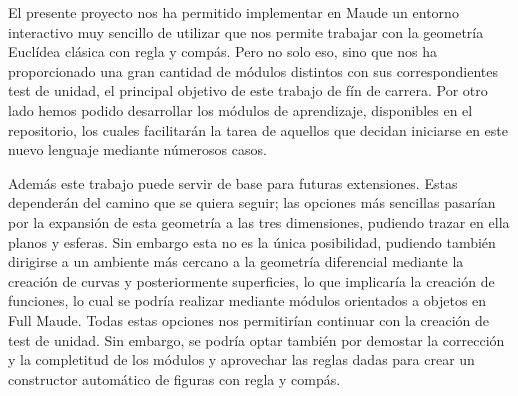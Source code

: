 
El presente proyecto nos ha permitido implementar en Maude un entorno interactivo muy sencillo de utilizar que nos permite trabajar con la geometría Euclídea clásica con regla y compás. Pero no solo eso, sino que nos ha proporcionado una gran cantidad de módulos distintos con sus correspondientes test de unidad, el principal objetivo de este trabajo de fín de carrera. Por otro lado hemos podido desarrollar los módulos de aprendizaje, disponibles en el repositorio, los cuales facilitarán la tarea de aquellos que decidan iniciarse en este nuevo lenguaje mediante númerosos casos. \par

Además este trabajo puede servir de base para futuras extensiones. Estas dependerán del camino que se quiera seguir; las opciones más sencillas pasarían por la expansión de esta geometría a las tres dimensiones, pudiendo trazar en ella planos y esferas. Sin embargo esta no es la única posibilidad, pudiendo también dirigirse a un ambiente más cercano a la geometría diferencial mediante la creación de curvas y posteriormente superficies, lo que implicaría la creación de funciones, lo cual se podría realizar mediante módulos orientados a objetos en Full Maude. Todas estas opciones nos permitirían continuar con la creación de test de unidad. Sin embargo, se podría optar también por demostar la corrección y la completitud de los módulos y aprovechar las reglas dadas para crear un constructor automático de figuras con regla y compás.
